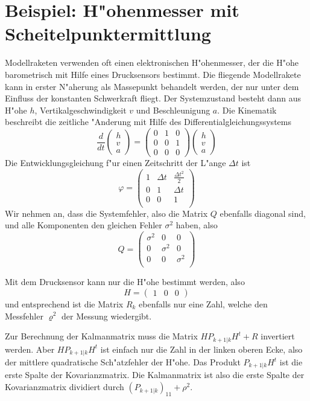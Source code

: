 \section{Beispiel: H"ohenmesser mit Scheitelpunktermittlung}
Modellraketen verwenden oft einen elektronischen H"ohenmesser, der die H"ohe
barometrisch mit Hilfe eines Drucksensors bestimmt. Die fliegende Modellrakete
kann in erster N"aherung als Massepunkt behandelt werden, der nur unter dem
Einfluss der konstanten Schwerkraft fliegt. Der Systemzustand besteht
dann aus H"ohe $h$, Vertikalgeschwindigkeit $v$ und Beschleunigung $a$.
Die Kinematik beschreibt die zeitliche "Anderung mit Hilfe des
Differentialgleichungssystems
\[
\frac{d}{dt}
\begin{pmatrix}
h\\v\\a
\end{pmatrix}
=
\begin{pmatrix}
0&1&0\\
0&0&1\\
0&0&0
\end{pmatrix}
\begin{pmatrix}
h\\v\\a
\end{pmatrix}
\]
Die Entwicklungsgleichung f"ur einen Zeitschritt der L"ange $\Delta t$ ist
\[
\varphi=\begin{pmatrix}
1&\Delta t&\frac{\Delta t^2}2\\
0&1&\Delta t\\
0&0&1\\
\end{pmatrix}
\]
Wir nehmen an, dass die Systemfehler, also die Matrix $Q$ ebenfalls diagonal sind,
und alle Komponenten den gleichen Fehler $\sigma^2$ haben, also
\[
Q=\begin{pmatrix}
\sigma^2&0&0\\
0&\sigma^2&0\\
0&0&\sigma^2\\
\end{pmatrix}
\]

Mit dem Drucksensor kann nur die H"ohe bestimmt werden, also
\[
H=\begin{pmatrix}1&0&0\end{pmatrix}
\]
und entsprechend ist die Matrix $R_k$ ebenfalls nur eine Zahl, welche
den Messfehler $\varrho^2$ der Messung wiedergibt.

Zur Berechnung der Kalmanmatrix muss die Matrix $HP_{k+1|k}H^t+R$ invertiert werden.
Aber $HP_{k+1|k}H^t$ ist einfach nur die Zahl in der linken oberen Ecke, also
der mittlere quadratische Sch"atzfehler der H"ohe. Das Produkt $P_{k+1|k}H^t$
ist die erste Spalte der Kovarianzmatrix. Die Kalmanmatrix ist also die erste
Spalte der Kovarianzmatrix dividiert durch $(P_{k+1|k})_{11}+\rho^2$.

